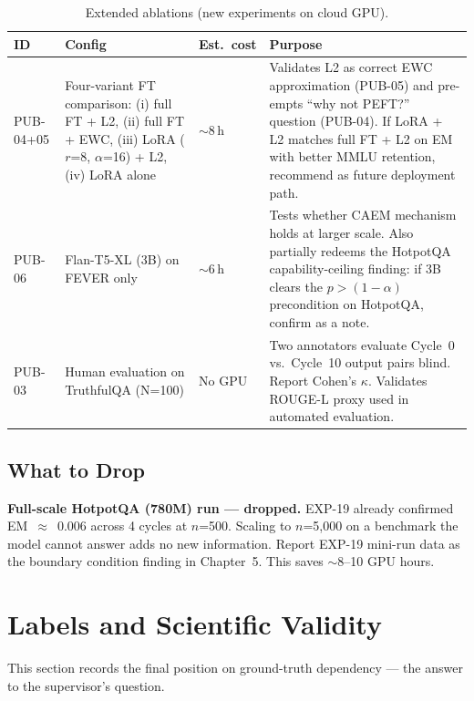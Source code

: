 \documentclass[12pt,a4paper]{article}
\newcommand{\caem}{CAEM}
\begin{document}
\begin{table}[htbp]
\centering
\caption{Extended ablations (new experiments on cloud GPU).}
\label{tab:pub-ablations}
\renewcommand{\arraystretch}{1.3}
\begin{tabular}{@{}p{1.4cm}p{3.0cm}p{2.0cm}p{6.8cm}@{}}
\toprule
\textbf{ID} & \textbf{Config} & \textbf{Est.\ cost} & \textbf{Purpose} \\
\midrule
PUB-04+05 & Four-variant FT comparison:
  (i) full FT + L2,
  (ii) full FT + EWC,
  (iii) LoRA ($r$=8, $\alpha$=16) + L2,
  (iv) LoRA alone &
  $\sim$8\,h & Validates L2 as correct EWC approximation (PUB-05) and
  pre-empts ``why not PEFT?'' question (PUB-04). If LoRA + L2 matches
  full FT + L2 on EM with better MMLU retention, recommend as future
  deployment path. \\
PUB-06 & Flan-T5-XL (3B) on FEVER only &
  $\sim$6\,h & Tests whether \caem{} mechanism holds at larger scale.
  Also partially redeems the HotpotQA capability-ceiling finding:
  if 3B clears the $p > (1-\alpha)$ precondition on HotpotQA, confirm
  as a note. \\
PUB-03 & Human evaluation on TruthfulQA (N=100) &
  No GPU & Two annotators evaluate Cycle~0 vs.\ Cycle~10 output pairs
  blind. Report Cohen's $\kappa$. Validates ROUGE-L proxy used in
  automated evaluation. \\
\bottomrule
\end{tabular}
\end{table}

\subsection{What to Drop}

\textbf{Full-scale HotpotQA (780M) run --- dropped.}
EXP-19 already confirmed EM~$\approx$~0.006 across 4 cycles at $n$=500.
Scaling to $n$=5,000 on a benchmark the model cannot answer adds no new
information.
Report EXP-19 mini-run data as the boundary condition finding in Chapter~5.
This saves $\sim$8--10 GPU hours.

\section{Labels and Scientific Validity}
\label{sec:labels}

This section records the final position on ground-truth dependency ---
the answer to the supervisor's question.
\end{document}
